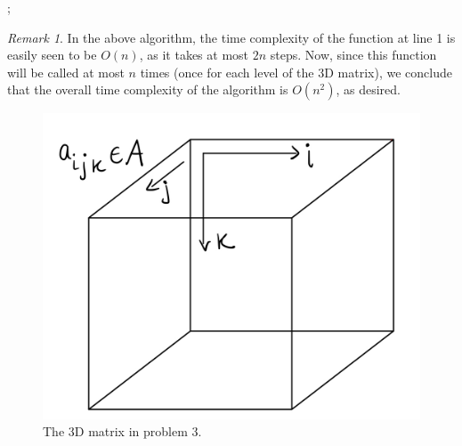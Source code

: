 \documentclass[12pt]{article}
\theoremstyle{definition}
\theoremstyle{remark}
\newtheorem*{remark}{Remark}
\begin{document}
\begin{enumerate}
\begin{enumerate}
\begin{algorithm}
    \BlankLine

    \BlankLine
    \Return \false;
   
    
  \end{algorithm}
  \begin{remark} 
    In the above algorithm, the time complexity of the function at line 1 is easily seen to be $O(n)$, as it takes at most $2n$ steps. Now, since this function will be called at most $n$ times (once for each level of the 3D matrix), we conclude that the overall time complexity of the algorithm is $O(n^2)$, as desired. 
\end{remark}

\newpage 
\begin{figure}
\label{matrix}
    \centering
    \includegraphics[scale=0.20]{3dmatrix.jpg}
    \caption{The 3D matrix in problem 3.}
\end{figure}

\end{enumerate}
\end{enumerate}
\end{document}
